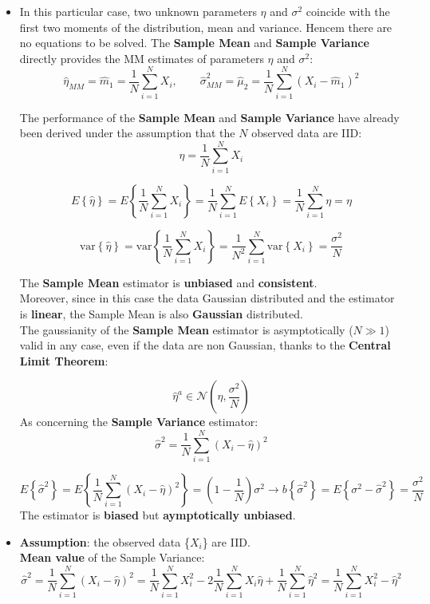 \begin{itemize}
    $$
    f_{X_i}(x_i) = \frac{1}{\sqrt{2\pi\sigma^2}} \, e^{ -\frac{(x_i-\eta)^2}{2\sigma^2} }
    \rightarrow
    m_1 \triangleq E\left\{ X_i \right\} = \eta, \qquad
    \mu_2 \triangleq \mathrm{var}\left\{ X_i \right\} = \sigma^2
    $$


    \item In this particular case, two unknown parameters \(\eta\) and \(\sigma^2\) coincide with the first two moments of the distribution, mean and variance. Hencem there are no equations to be solved. The \textbf{Sample Mean} and \textbf{Sample Variance} directly provides the MM estimates of parameters \(\eta\) and \(\sigma^2\):
    $$
\hat{\eta}_{MM} = \hat{m}_1 = \frac{1}{N} \sum_{i=1}^N X_i,
\qquad
\hat{\sigma}^2_{MM} = \hat{\mu}_2 = \frac{1}{N} \sum_{i=1}^N ( X_i - \hat{m}_1 )^2
$$

    \noindent The performance of the \textbf{Sample Mean} and \textbf{Sample Variance} have already been derived under the assumption that the \(N\) observed data are IID:
$$
\hat{\eta} = \frac{1}{N} \sum_{i=1}^N X_i
$$

$$
E\left\{ \hat{\eta} \right\} = E\left\{ \frac{1}{N} \sum_{i=1}^N X_i \right\}
= \frac{1}{N} \sum_{i=1}^N E\left\{ X_i \right\}
= \frac{1}{N} \sum_{i=1}^N \eta
= \eta
$$

$$
\mathrm{var}\left\{ \hat{\eta} \right\}
= \mathrm{var}\left\{ \frac{1}{N} \sum_{i=1}^N X_i \right\}
= \frac{1}{N^2} \sum_{i=1}^N \mathrm{var}\left\{ X_i \right\}
= \frac{\sigma^2}{N}
$$


    \noindent The \textbf{Sample Mean} estimator is \textbf{unbiased} and \textbf{consistent}.\\
    \noindent Moreover, since in this case the data Gaussian distributed and the estimator is \textbf{linear}, the Sample Mean is also \textbf{Gaussian} distributed.\\
    \noindent The gaussianity of the \textbf{Sample Mean} estimator is asymptotically (\(N\gg1\)) valid in any case, even if the data are non Gaussian, thanks to the \textbf{Central Limit Theorem}:

    $$
\hat{\eta}^a \in \mathcal{N} \left( \eta, \frac{\sigma^2}{N} \right)
$$
    \noindent As concerning the \textbf{Sample Variance} estimator:
$$
\hat{\sigma}^2 = \frac{1}{N} \sum_{i=1}^N (X_i - \hat{\eta})^2
$$

$$
E\left\{ \hat{\sigma}^2 \right\} 
= E\left\{ \frac{1}{N} \sum_{i=1}^N (X_i - \hat{\eta})^2 \right\}
= \left( 1 - \frac{1}{N} \right)\sigma^2
\rightarrow
b\left\{ \hat{\sigma}^2 \right\}
= E\left\{ \sigma^2 - \hat{\sigma}^2 \right\}
= \frac{\sigma^2}{N}
$$
    The estimator is \textbf{biased} but \textbf{aymptotically unbiased}. \vspace*{0.5em}
    \item  \textbf{Assumption}: the observed data \{\(X_i\)\} are IID.\\
    \noindent \textbf{Mean value} of the Sample Variance:
$$
\hat{\sigma}^2 = \frac{1}{N} \sum_{i=1}^N (X_i - \hat{\eta})^2
= \frac{1}{N} \sum_{i=1}^N X_i^2 - 2 \frac{1}{N} \sum_{i=1}^N X_i \hat{\eta} + \frac{1}{N} \sum_{i=1}^N \hat{\eta}^2
= \frac{1}{N} \sum_{i=1}^N X_i^2 - \hat{\eta}^2
$$


\end{itemize}
